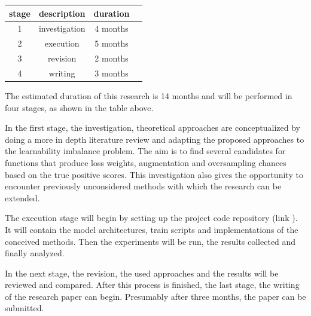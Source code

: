 \documentclass[journal]{IEEEtran}
\begin{document}
\begin{center}

        \begin{tabular}{ |c|c|c|c| } 
                \hline
                stage & description & duration \\
                \hline
                1 & investigation & 4 months \\ 
                2 & execution & 5 months \\ 
                3 & revision & 2 months \\ 
                4 & writing & 3 months \\
                \hline

        \end{tabular}
\end{center}
The estimated duration of this research is 14 months and will be performed in four stages, as shown in the table above.

In the first stage, the investigation, theoretical approaches are conceptualized by doing a more in depth literature review and adapting the proposed approaches to the learnability imbalance problem. 
The aim is to find several candidates for functions that produce loss weights, augmentation and oversampling chances based on the true positive scores.
This investigation also gives the opportunity to encounter previously unconsidered methods with which the research can be extended.

The execution stage will begin by setting up the project code repository (link \cite{githubResearchProposal}). 
It will contain the model architectures, train scripts and implementations of the conceived methods.
Then the experiments will be run, the results collected and finally analyzed. 

In the next stage, the revision, the used approaches and the results will be reviewed and compared. 
After this process is finished, the last stage, the writing of the research paper can begin. 
Presumably after three months, the paper can be submitted.  

\printbibliography
\end{document}

